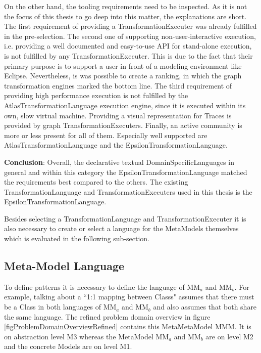 On the other hand, the tooling requirements need to be inspected. As it is not the focus of this thesis to go deep into this matter, the explanations are short. The first requirement of providing a \gls{TransformationExecuter} was already fulfilled in the pre-selection. The second one of supporting non-user-interactive execution, i.e. providing a well documented and easy-to-use API for stand-alone execution, is  not fulfilled by any \gls{TransformationExecuter}. This is due to the fact that their primary purpose is to support a user in front of a modeling environment like Eclipse. Nevertheless, is was possible to create a ranking, in which the graph transformation engines marked the bottom line. The third requirement of providing high performance execution is not fulfilled by the \gls{AtlasTransformationLanguage} execution engine, since it is executed within its own, slow virtual machine. Providing a visual representation for \glspl{Trace} is provided by graph \glspl{TransformationExecuter}. Finally, an active community is more or less present for all of them. Especially well supported are \gls{AtlasTransformationLanguage} and the \gls{EpsilonTransformationLanguage}.

\textbf{Conclusion}: Overall, the declarative textual \glspl{DomainSpecificLanguage} in general and within this category the \gls{EpsilonTransformationLanguage} matched the requirements best compared to the others. The existing \gls{TransformationLanguage} and \glspl{TransformationExecuter} used in this thesis is the \gls{EpsilonTransformationLanguage}.

Besides selecting a \gls{TransformationLanguage} and \gls{TransformationExecuter} it is also necessary to create or select a language for the \glspl{MetaModel} themselves which is evaluated in the following sub-section.


\subsection{Meta-Model Language}\label{secModelLanguage}

To define patterns it is necessary to define the language of MM$_a$ and MM$_b$. For example, talking about a ``1:1 mapping between \glspl{Class}" assumes that there must be a \gls{Class} in both languages of MM$_a$ and MM$_b$ and also assumes that both share the same language. The refined problem domain overview in figure \ref{figProblemDomainOverviewRefined} contains this \gls{MetaMetaModel} MMM. It is on abstraction level M3 whereas the \gls{MetaModel} MM$_a$ and MM$_b$ are on level M2 and the concrete \glspl{Model} are on level M1.

